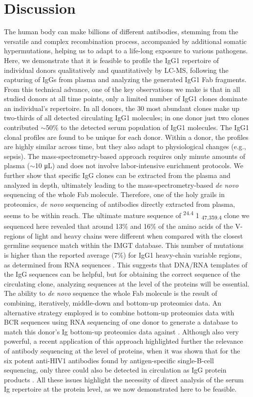 \section{Discussion}
The human body can make billions of different antibodies, stemming from the versatile and complex recombination process, accompanied by additional somatic hypermutations, helping us to adapt to a life-long exposure to various pathogens. Here, we demonstrate that it is feasible to profile the IgG1 repertoire of individual donors qualitatively and quantitatively by LC-MS, following the capturing of IgGs from plasma and analyzing the generated IgG1 Fab fragments. From this technical advance, one of the key observations we make is that in all studied donors at all time points, only a limited number of IgG1 clones dominate an individual’s repertoire. In all donors, the 30 most abundant clones make up two-thirds of all detected circulating IgG1 molecules; in one donor just two clones contributed $\sim$50\% to the detected serum population of IgG1 molecules. The IgG1 clonal profiles are found to be unique for each donor. Within a donor, the profiles are highly similar across time, but they also adapt to physiological changes (e.g., sepsis). The mass-spectrometry-based approach requires only minute amounts of plasma ($\sim$10 μL) and does not involve labor-intensive enrichment protocols. We further show that specific IgG clones can be extracted from the plasma and analyzed in depth, ultimately leading to the mass-spectrometry-based \emph{de novo} sequencing of the whole Fab molecule. Therefore, one of the holy grails in proteomics, \emph{de novo} sequencing of antibodies directly extracted from plasma, seems to be within reach.
The ultimate mature sequence of \textsuperscript{24.4} 1 \textsubscript{47,359.4} clone we sequenced here revealed that around 13\% and 16\% of the amino acids of the V-regions of light and heavy chains were different when compared with the closest germline sequence match within the IMGT database. This number of mutations is higher than the reported average (7\%) for IgG1 heavy-chain variable regions, as determined from RNA sequences \cite{kitaura2017different}. This suggests that DNA/RNA templates of the IgG sequences can be helpful, but for obtaining the correct sequence of the circulating clone, analyzing sequences at the level of the proteins will be essential.
The ability to \emph{de novo} sequence the whole Fab molecule is the result of combining, iteratively, middle-down and bottom-up proteomics data. An alternative strategy employed is to combine bottom-up proteomics data with BCR sequences using RNA sequencing of one donor to generate a database to match this donor’s Ig bottom-up proteomics data against \cite{lee2016molecular-level}. Although also very powerful, a recent application of this approach highlighted further the relevance of antibody sequencing at the level of proteins, when it was shown that for the six potent anti-HIV1 antibodies found by antigen-specific single-B-cell sequencing, only three could also be detected in circulation as IgG protein products \cite{williams2017potent}. All these issues highlight the necessity of direct analysis of the serum Ig repertoire at the protein level, as we now demonstrated here to be feasible.
